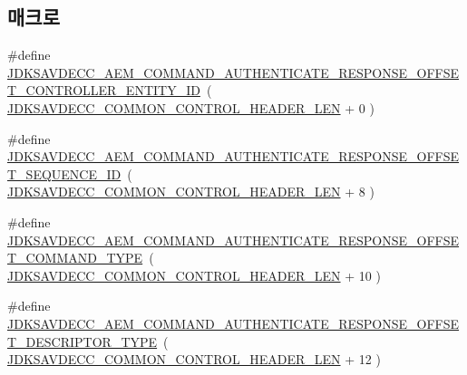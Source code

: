 \subsection*{매크로}
\begin{DoxyCompactItemize}
\item 
\#define \hyperlink{group__command__authenticate__response_gaa7dad1e04cd9f879068c1bdf77157c3c}{J\+D\+K\+S\+A\+V\+D\+E\+C\+C\+\_\+\+A\+E\+M\+\_\+\+C\+O\+M\+M\+A\+N\+D\+\_\+\+A\+U\+T\+H\+E\+N\+T\+I\+C\+A\+T\+E\+\_\+\+R\+E\+S\+P\+O\+N\+S\+E\+\_\+\+O\+F\+F\+S\+E\+T\+\_\+\+C\+O\+N\+T\+R\+O\+L\+L\+E\+R\+\_\+\+E\+N\+T\+I\+T\+Y\+\_\+\+ID}~( \hyperlink{group__jdksavdecc__avtp__common__control__header_gaae84052886fb1bb42f3bc5f85b741dff}{J\+D\+K\+S\+A\+V\+D\+E\+C\+C\+\_\+\+C\+O\+M\+M\+O\+N\+\_\+\+C\+O\+N\+T\+R\+O\+L\+\_\+\+H\+E\+A\+D\+E\+R\+\_\+\+L\+EN} + 0 )
\item 
\#define \hyperlink{group__command__authenticate__response_ga8b60ab7d2cfc8d55f6dd110198a8cc74}{J\+D\+K\+S\+A\+V\+D\+E\+C\+C\+\_\+\+A\+E\+M\+\_\+\+C\+O\+M\+M\+A\+N\+D\+\_\+\+A\+U\+T\+H\+E\+N\+T\+I\+C\+A\+T\+E\+\_\+\+R\+E\+S\+P\+O\+N\+S\+E\+\_\+\+O\+F\+F\+S\+E\+T\+\_\+\+S\+E\+Q\+U\+E\+N\+C\+E\+\_\+\+ID}~( \hyperlink{group__jdksavdecc__avtp__common__control__header_gaae84052886fb1bb42f3bc5f85b741dff}{J\+D\+K\+S\+A\+V\+D\+E\+C\+C\+\_\+\+C\+O\+M\+M\+O\+N\+\_\+\+C\+O\+N\+T\+R\+O\+L\+\_\+\+H\+E\+A\+D\+E\+R\+\_\+\+L\+EN} + 8 )
\item 
\#define \hyperlink{group__command__authenticate__response_ga1ad1633eb9bf654be305f991af370f10}{J\+D\+K\+S\+A\+V\+D\+E\+C\+C\+\_\+\+A\+E\+M\+\_\+\+C\+O\+M\+M\+A\+N\+D\+\_\+\+A\+U\+T\+H\+E\+N\+T\+I\+C\+A\+T\+E\+\_\+\+R\+E\+S\+P\+O\+N\+S\+E\+\_\+\+O\+F\+F\+S\+E\+T\+\_\+\+C\+O\+M\+M\+A\+N\+D\+\_\+\+T\+Y\+PE}~( \hyperlink{group__jdksavdecc__avtp__common__control__header_gaae84052886fb1bb42f3bc5f85b741dff}{J\+D\+K\+S\+A\+V\+D\+E\+C\+C\+\_\+\+C\+O\+M\+M\+O\+N\+\_\+\+C\+O\+N\+T\+R\+O\+L\+\_\+\+H\+E\+A\+D\+E\+R\+\_\+\+L\+EN} + 10 )
\item 
\#define \hyperlink{group__command__authenticate__response_ga6ddae933ca133d914d431563b2058f6d}{J\+D\+K\+S\+A\+V\+D\+E\+C\+C\+\_\+\+A\+E\+M\+\_\+\+C\+O\+M\+M\+A\+N\+D\+\_\+\+A\+U\+T\+H\+E\+N\+T\+I\+C\+A\+T\+E\+\_\+\+R\+E\+S\+P\+O\+N\+S\+E\+\_\+\+O\+F\+F\+S\+E\+T\+\_\+\+D\+E\+S\+C\+R\+I\+P\+T\+O\+R\+\_\+\+T\+Y\+PE}~( \hyperlink{group__jdksavdecc__avtp__common__control__header_gaae84052886fb1bb42f3bc5f85b741dff}{J\+D\+K\+S\+A\+V\+D\+E\+C\+C\+\_\+\+C\+O\+M\+M\+O\+N\+\_\+\+C\+O\+N\+T\+R\+O\+L\+\_\+\+H\+E\+A\+D\+E\+R\+\_\+\+L\+EN} + 12 )
\item 

\end{DoxyCompactItemize}
